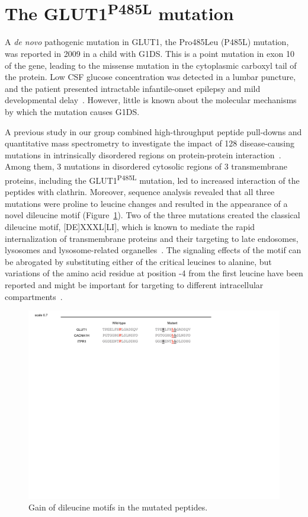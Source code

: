  \section{The GLUT1\textsuperscript{P485L} mutation}

A \textit{de novo} pathogenic mutation in GLUT1, the Pro485Leu (P485L) mutation, was reported in 2009 in a child with G1DS. This is a point mutation in exon 10 of the gene, leading to the missense mutation in the cytoplasmic carboxyl tail of the protein. Low CSF glucose concentration was detected in a lumbar puncture, and the patient presented intractable infantile-onset epilepsy and mild developmental delay~\cite{Slaughter}. However, little is known about the molecular mechanisms by which the mutation causes G1DS.

A previous study in our group combined high-throughput peptide pull-downs and quantitative mass spectrometry to investigate the impact of 128 disease-causing mutations in intrinsically disordered regions on protein-protein interaction~\cite{Meyer2}. Among them, 3 mutations in disordered cytosolic regions of 3 transmembrane proteins, including the GLUT1\textsuperscript{P485L} mutation, led to increased interaction of the peptides with clathrin. Moreover, sequence analysis revealed that all three mutations were proline to leucine changes and resulted in the appearance of a novel dileucine motif (Figure~\ref{fig:motif}). Two of the three mutations created the classical dileucine motif, [DE]XXXL[LI], which is known to mediate the rapid internalization of transmembrane proteins and their targeting to late endosomes, lysosomes and lysosome-related organelles~\cite{Bonifacino}. The signaling effects of the motif can be abrogated by substituting either of the critical leucines to alanine, but variations of the amino acid residue at position -4 from the first leucine have been reported and might be important for targeting to different intracellular compartments~\cite{Bonifacino,Sandoval}.
\begin{figure}[h]
\centering
\includegraphics[scale=0.7]{Figures/motif}
\caption{Gain of dileucine motifs in the mutated peptides.}
\label{fig:motif}
\end{figure}

